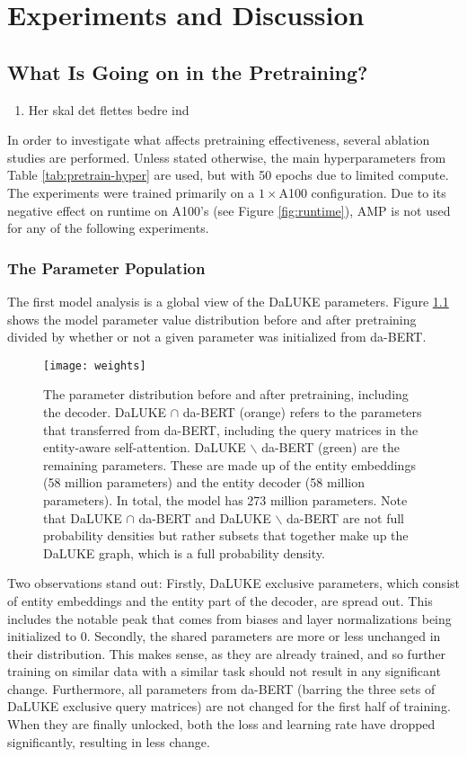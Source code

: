 \documentclass[main.tex]{subfiles}
\begin{document}
\chapter{Experiments and Discussion}
\label{chap:discussion}

\section{What Is Going on in the Pretraining?}
\label{sec:pretrainpls}
\begin{enumerate}
    \item Her skal det flettes bedre ind
\end{enumerate}
In order to investigate what affects pretraining effectiveness, several ablation studies are performed.
Unless stated otherwise, the main hyperparameters from Table \ref{tab:pretrain-hyper} are used, but with 50 epochs due to limited compute.
The experiments were trained primarily on a $ 1\times$A100 configuration.
Due to its negative effect on runtime on A100's (see Figure \ref{fig:runtime}), AMP is not used for any of the following experiments.
\subsection{The Parameter Population}
The first model analysis is a global view of the DaLUKE parameters.
Figure \ref{fig:weight-dist} shows the model parameter value distribution before and after pretraining divided by whether or not a given parameter was initialized from da-BERT.
\begin{figure}[H]
    \centering
    \texttt{[image: weights]}
    \caption{
        The parameter distribution before and after pretraining, including the decoder.
        DaLUKE $ \cap $ da-BERT (orange) refers to the parameters that transferred from da-BERT, including the query matrices in the entity-aware self-attention.
        DaLUKE $ \backslash $ da-BERT (green) are the remaining parameters.
        These are made up of the entity embeddings (58 million parameters) and the entity decoder (58 million parameters).
        In total, the model has 273 million parameters.
        Note that DaLUKE $ \cap $ da-BERT and DaLUKE $ \backslash $ da-BERT are not full probability densities but rather subsets that together make up the DaLUKE graph, which is a full probability density.
    }
    \label{fig:weight-dist}
\end{figure}\noindent
Two observations stand out:
Firstly, DaLUKE exclusive parameters, which consist of entity embeddings and the entity part of the decoder, are spread out.
This includes the notable peak that comes from biases and layer normalizations being initialized to 0.
Secondly, the shared parameters are more or less unchanged in their distribution.
This makes sense, as they are already trained, and so further training on similar data with a similar task should not result in any significant change.
Furthermore, all parameters from da-BERT (barring the three sets of DaLUKE exclusive query matrices) are not changed for the first half of training.
When they are finally unlocked, both the loss and learning rate have dropped significantly, resulting in less change.
\end{document}
